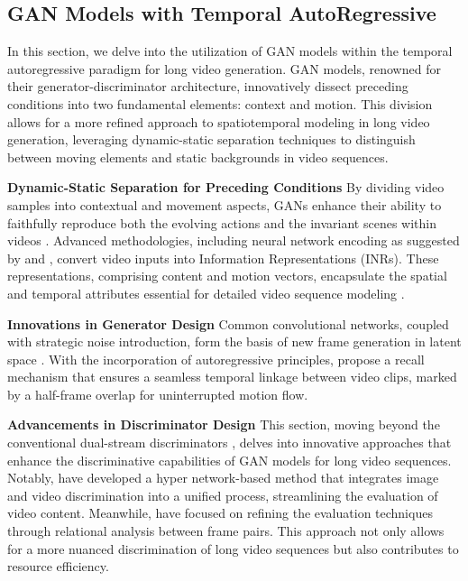 \documentclass{article}
\begin{document}
\subsection{GAN Models with Temporal AutoRegressive}
In this section, we delve into the utilization of GAN models within the temporal autoregressive paradigm for long video generation. GAN models, renowned for their generator-discriminator architecture, innovatively dissect preceding conditions into two fundamental elements: context and motion. This division allows for a more refined approach to spatiotemporal modeling in long video generation, leveraging dynamic-static separation techniques to distinguish between moving elements and static backgrounds in video sequences.


\noindent\textbf{Dynamic-Static Separation for Preceding Conditions}
By dividing video samples into contextual and movement aspects, GANs enhance their ability to faithfully reproduce both the evolving actions and the invariant scenes within videos \citep{REnc-GAN3}. Advanced methodologies, including neural network encoding as suggested by \cite{Stylegan-v} and \cite{DIGAN}, convert video inputs into Information Representations (INRs). These representations, comprising content and motion vectors, encapsulate the spatial and temporal attributes essential for detailed video sequence modeling \citep{DIGAN}.


\noindent\textbf{Innovations in Generator Design}
Common convolutional networks, coupled with strategic noise introduction, form the basis of new frame generation in latent space \citep{Stylegan-v, DIGAN}. With the incorporation of autoregressive principles, \cite{REnc-GAN3} propose a recall mechanism that ensures a seamless temporal linkage between video clips, marked by a half-frame overlap for uninterrupted motion flow.


\noindent\textbf{Advancements in Discriminator Design}
This section, moving beyond the conventional dual-stream discriminators \citep{REnc-GAN3}, delves into innovative approaches that enhance the discriminative capabilities of GAN models for long video sequences. Notably, \cite{Stylegan-v} have developed a hyper network-based method that integrates image and video discrimination into a unified process, streamlining the evaluation of video content. Meanwhile, \cite{DIGAN} have focused on refining the evaluation techniques through relational analysis between frame pairs. This approach not only allows for a more nuanced discrimination of long video sequences but also contributes to resource efficiency. 
\end{document}
